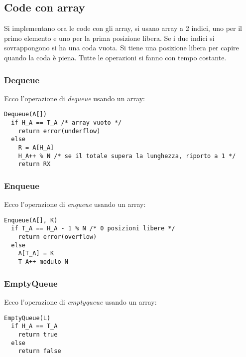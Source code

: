 \documentclass[a4paper,12pt,oneside,tikz]{book}
\begin{document}
\subsection{Code con array}
Si implementano ora le code con gli array, si usano array a 2 indici, uno per il primo elemento e uno per la prima posizione libera. Se i due indici si sovrappongono si ha una coda vuota. Si tiene una posizione libera per capire quando la coda è piena. Tutte le operazioni si fanno con tempo costante.
\subsubsection{Dequeue}
Ecco l'operazione di \textit{dequeue} usando un array:
\begin{verbatim}
Dequeue(A[])
  if H_A == T_A /* array vuoto */
    return error(underflow)
  else
    R = A[H_A]
    H_A++ % N /* se il totale supera la lunghezza, riporto a 1 */
    return RX
\end{verbatim}
\subsubsection{Enqueue}
Ecco l'operazione di \textit{enqueue} usando un array:
\begin{verbatim}
Enqueue(A[], K)
  if T_A == H_A - 1 % N /* 0 posizioni libere */
    return error(overflow)
  else
    A[T_A] = K
    T_A++ modulo N
\end{verbatim}
\subsubsection{EmptyQueue}
Ecco l'operazione di \textit{emptyqueue} usando un array:
\begin{verbatim}
EmptyQueue(L)
  if H_A == T_A
    return true
  else
    return false
\end{verbatim}
\end{document}

